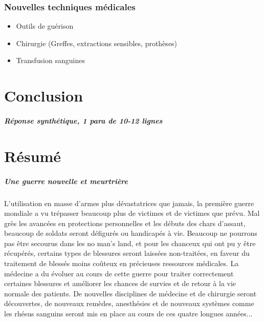 \documentclass[a4paper, BCOR=0mm, fontsize=12pt, titlepage=firstiscover]{scrreprt}
\begin{document}
		\subsection{Nouvelles techniques médicales}
		\begin{itemize}
			\item Outils de guérison
			\item Chirurgie (Greffes, extractions sensibles, prothèses)
			\item Transfusion sanguines
		\end{itemize}
	\chapter{Conclusion}
		\paragraph{Réponse synthétique, 1 para de 10-12 lignes}

	\printindex
	\nocite{*}
	\printglossary[title=Glossaire et abbréviations,toctitle=Glossaire et abbréviations]
	
	
	
	
	\chapter*{Résumé}
		\paragraph{Une guerre nouvelle et meurtrière}
		L'utilisation en masse d'armes plus dévastatrices que jamais, la première guerre mondiale a vu trépasser beaucoup plus de victimes et de victimes que prévu.
		Mal grès les avancées en protections personnelles et les débuts des chars d'assaut, beaucoup de soldats seront défigurés ou handicapés à vie.
		Beaucoup ne pourrons pas être secourus dans les no man's land, et pour les chanceux qui ont pu y être récupérés, certains types de blessures seront laissées non-traitées, en faveur du traitement de blessés moins coûteux en précieuses ressources médicales. 
		La médecine a du évoluer au cours de cette guerre pour traiter correctement certaines blessures et améliorer les chances de survies et de retour à la vie normale des patients.
		De nouvelles disciplines de médecine et de chirurgie seront découvertes, de nouveaux remèdes, anesthésies et de nouveaux systèmes comme les rhésus sanguins seront mis en place au cours de ces quatre longues années...     
		
		
		
	
	
\end{document}
